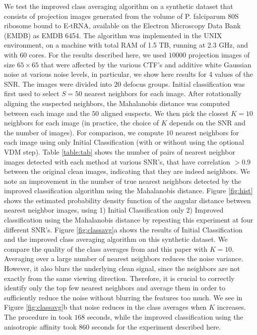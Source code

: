 \documentclass{article}
\begin{document}
We test the improved class averaging algorithm on a synthetic dataset that consists of projection images generated from the volume of P. falciparum 80S ribosome bound to E-tRNA, available on the Electron Microscopy Data Bank (EMDB) as EMDB 6454. The algorithm was implemented in the UNIX environment, on a machine with total RAM of 1.5 TB, running at 2.3 GHz, and with 60 cores. 
For the results described here, we used $10000$ projection images of size $65 \times 65$ that were affected by the various CTF's and additive white Gaussian noise at various noise levels, in particular, we show here results for 4 values of the SNR. The images were divided into $20$ defocus groups. Initial classification was first used to select $S=50$ nearest neighbors for each image. After rotationally aligning the suspected neighbors, the Mahalanobis distance was computed between each image and the $50$ aligned suspects. We then pick the closest $K=10$ neighbors for each image (in practice, the choice of $K$ depends on the SNR and the number of images). For comparison, we compute $10$ nearest neighbors for each image using only Initial Classification (with or without using the optional VDM step). Table \ref{table:tab} shows the number of pairs of nearest neighbor images detected with each method at various SNR's, that have correlation $>0.9$ between the original clean images, indicating that they are indeed neighbors. We note an improvement in the number of true nearest neighbors detected by the improved classification algorithm using the Mahalanobis distance. Figure \ref{fig:hist} shows the estimated probability density function of the angular distance between nearest neighbor images, using 1) Initial Classification only 2) Improved classification using the Mahalanobis distance by repeating this experiment at four different SNR's. Figure \ref{fig:classavg}a shows the results of Initial Classification and the improved class averaging algorithm on this synthetic dataset. We compare the quality of the class averages from \cite{zhao} and this paper with $K=10$. Averaging over a large number of nearest neighbors reduces the noise variance. However, it also blurs the underlying clean signal, since the neighbors are not exactly from the same viewing direction. Therefore, it is crucial to correctly identify only the top few nearest neighbors and average them in order to sufficiently reduce the noise without  blurring the features too much. We see in Figure \ref{fig:classavg}b that noise reduces in the class averages when $K$ increases. The procedure in \cite{zhao} took $168$ seconds, while the improved classification using the anisotropic affinity took $860$ seconds for the experiment described here. 
\end{document}

